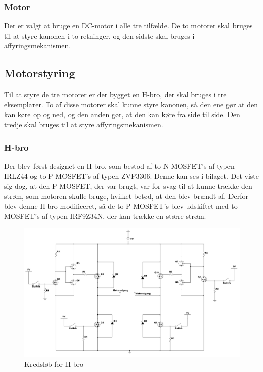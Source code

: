 \subsubsection{Motor}
Der er valgt at bruge en DC-motor i alle tre tilfælde. De to motorer skal bruges til at styre kanonen i to retninger, og den sidste skal bruges i affyringsmekanismen. 

\subsection{Motorstyring}
Til at styre de tre motorer er der bygget en H-bro, der skal bruges i tre eksemplarer. To af disse motorer skal kunne styre kanonen, så den ene gør at den kan køre op og ned, og den anden gør, at den kan køre fra side til side. Den tredje skal bruges til at styre affyringsmekanismen. 

\subsubsection{H-bro}
Der blev først designet en H-bro, som bestod af to N-MOSFET's af typen IRLZ44 og to P-MOSFET's af typen ZVP3306. Denne kan ses i bilaget. Det viste sig dog, at den P-MOSFET, der var brugt, var for svag til at kunne trække den strøm, som motoren skulle bruge, hvilket betød, at den blev brændt af. Derfor blev denne H-bro modificeret, så de to P-MOSFET's blev udskiftet med to MOSFET's af typen IRF9Z34N, der kan trække en større strøm. 

\begin{figure}[H]
	\centering
	\includegraphics[width=\textwidth]{DesignOgImplementering/images/H-bro}
	\caption{Kredsløb for H-bro}
	\label{fig:hbro}
	\end{figure}
	

